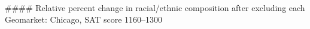 #### Relative percent change in racial/ethnic composition after excluding each Geomarket: Chicago, SAT score 1160–1300
